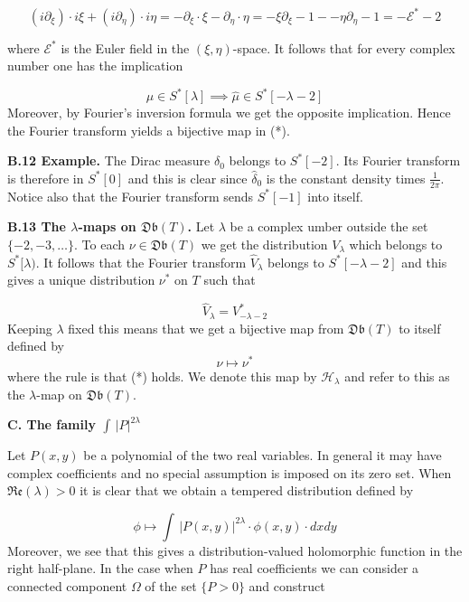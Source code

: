 \[
(i\partial_\xi)\cdot i\xi+(i\partial_\eta)\cdot i\eta=
-\partial_\xi\cdot \xi-\partial_\eta\cdot \eta=-\xi\partial_\xi-1-
-\eta\partial_\eta-1=-\mathcal E^*-2
\]

\noindent
where $\mathcal E^*$ is the Euler field in the 
$(\xi,\eta)$-space.
It follows that for every complex number one has
the implication

\[
\mu\in S^*[\lambda]\implies\widehat\mu\in S^*[-\lambda-2]\tag{*}
\]
Moreover, by Fourier's inversion formula we
get the opposite implication. Hence the Fourier transform
yields a bijective map in (*). 


\noindent
{\bf{B.12 Example.}}
The Dirac measure $\delta_0$
belongs to $S^*[-2]$. Its Fourier transform
is therefore in $S^*[0]$ and this is clear since
$\widehat\delta_0$ is  the constant density
times $\frac{1}{2\pi}$.
Notice also that the Fourier transform sends
$S^*[-1]$ into itself.
\bigskip

\noindent
{\bf{B.13 The $\lambda$-maps on $\mathfrak{Db}(T)$.}}
Let $\lambda$ be a complex umber outside the set
$\{-2,-3,\ldots\}$. 
To each $\nu\in\mathfrak{Db}(T)$
we get the distribution $V_\lambda$ which belongs to
$S^*[\lambda)$.
It follows that the Fourier transform
$\widehat V_\lambda$ belongs to $S^*[-\lambda-2]$ and
this gives a unique distribution
$\nu^*$ on $T$
such that

\[
\widehat V_\lambda=V^*_{-\lambda-2}\tag{*}
\]
Keeping $\lambda$ fixed this means that we get a bijective map from
$\mathfrak{Db}(T)$ to itself defined by
\[ 
\nu\mapsto \nu^*
\]
where the rule is that (*) holds.
We denote this map by
$\mathcal H_\lambda$ and refer to this as the
$\lambda$-map on $\mathfrak{Db}(T)$.









\bigskip

\centerline{\bf  {C. The family $\int\,|P|^{2\lambda}$}}

\bigskip

\noindent
Let $P(x,y)$ be a polynomial of the two real variables. In general it
may have complex coefficients and no special assumption
is imposed on its zero set.
When $\mathfrak{Re}(\lambda)>0$
it is clear that we obtain a tempered distribution defined by

\[
\phi\mapsto \int\, |P(x,y)|^{2\lambda}\cdot\phi(x,y)\cdot dxdy\tag{*}
\]
Moreover, we see  that this gives a distribution-valued holomorphic
function in the right half-plane.
In the case when $P$ has real coefficients we can consider
a connected component $\Omega$ of the set $\{P>0\}$
and construct


